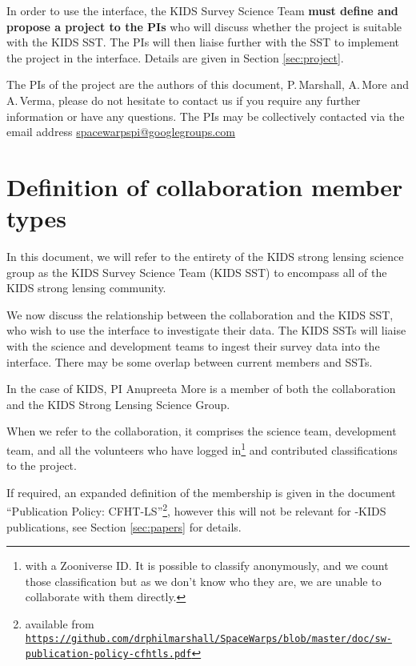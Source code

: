 \documentclass[a4paper,twocolumn]{article}
\begin{document}
In order to use the \SW interface, the KIDS Survey Science Team
\textbf{must define and propose a project to the \SW PIs} who will
discuss whether the project is suitable with the KIDS SST. The \SW PIs will
then liaise further with the SST to implement the project in the \SW
interface. Details are given in Section \ref{sec:project}.

\vspace{4mm} The PIs of the \SW project are the authors of this
document, P.\,Marshall, A.\,More and A.\,Verma, please do not hesitate
to contact us if you require any further information or have any
questions. The PIs may be collectively contacted via the email address
\href{mailto:spacewarpspi@googlegroups.com}{spacewarpspi@googlegroups.com}




\section{Definition of collaboration member types}
\label{sec:members}

In this document, we will refer to the entirety of the KIDS strong
lensing science group as the KIDS Survey Science Team (KIDS SST) to
encompass all of the KIDS strong lensing community.

We now discuss the relationship between the \SW collaboration and the
KIDS SST, who wish to use the \SW interface to investigate their
data. The KIDS SSTs will liaise with the \SW science and development
teams to ingest their survey data into the \SW interface. There may be
some overlap between current \SW members and SSTs. 

In the case of KIDS, \SW PI Anupreeta More is a member of both the \SW
collaboration and the KIDS Strong Lensing Science Group.

When we refer to the \SW collaboration, it comprises the \SW science
team, \SW development team, and all the volunteers who have logged
in\footnote{with a Zooniverse ID. It is possible to classify
  anonymously, and we count those classification but as we don't know
  who they are, we are unable to collaborate with them directly.} and
contributed classifications to the project.

If required, an expanded definition of the \SW membership is given in
the document ``\SW Publication Policy: CFHT-LS''\footnote{available
  from
  \texttt{\url{https://github.com/drphilmarshall/SpaceWarps/blob/master/doc/sw-publication-policy-cfhtls.pdf}}},
however this will not be relevant for \SW-KIDS publications, see
Section \ref{sec:papers} for details.
\end{document}
